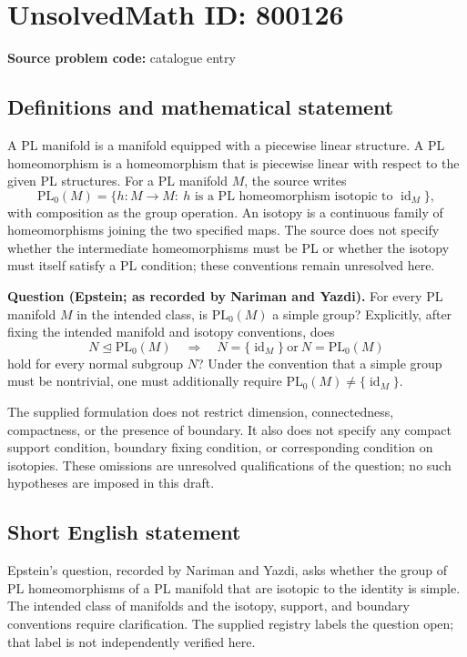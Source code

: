 \documentclass[11pt]{article}
\begin{document}
\section*{UnsolvedMath ID: 800126}
\textbf{Source problem code:} catalogue entry
\subsection{Definitions and mathematical statement}
A PL manifold is a manifold equipped with a piecewise linear structure. A PL homeomorphism is a homeomorphism that is piecewise linear with respect to the given PL structures. For a PL manifold \(M\), the source writes
\[
\mathrm{PL}_0(M)=\{h\colon M\to M:\ h\text{ is a PL homeomorphism isotopic to }\operatorname{id}_M\},
\]
with composition as the group operation. An isotopy is a continuous family of homeomorphisms joining the two specified maps. The source does not specify whether the intermediate homeomorphisms must be PL or whether the isotopy must itself satisfy a PL condition; these conventions remain unresolved here.

\textbf{Question (Epstein; as recorded by Nariman and Yazdi).} For every PL manifold \(M\) in the intended class, is \(\mathrm{PL}_0(M)\) a simple group? Explicitly, after fixing the intended manifold and isotopy conventions, does
\[
N\trianglelefteq\mathrm{PL}_0(M)
\quad\Longrightarrow\quad
N=\{\operatorname{id}_M\}\ \text{or}\ N=\mathrm{PL}_0(M)
\]
hold for every normal subgroup \(N\)? Under the convention that a simple group must be nontrivial, one must additionally require \(\mathrm{PL}_0(M)\ne\{\operatorname{id}_M\}\).

The supplied formulation does not restrict dimension, connectedness, compactness, or the presence of boundary. It also does not specify any compact support condition, boundary fixing condition, or corresponding condition on isotopies. These omissions are unresolved qualifications of the question; no such hypotheses are imposed in this draft.
\subsection{Short English statement}
Epstein's question, recorded by Nariman and Yazdi, asks whether the group of PL homeomorphisms of a PL manifold that are isotopic to the identity is simple. The intended class of manifolds and the isotopy, support, and boundary conventions require clarification. The supplied registry labels the question open; that label is not independently verified here.
\end{document}
